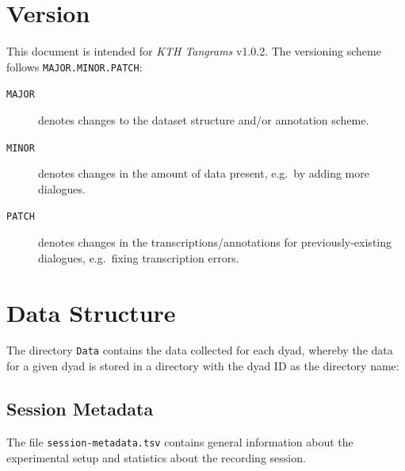 \documentclass[USenglish]{article}
\newcommand{\inlinecode}[1]{\texttt{#1}}	%
\newcommand{\corpusname}{KTH Tangrams}
\newcommand{\corpusversion}{\mbox{v1.0.2}}
\begin{document}
\section{Version}

This document is intended for  \emph{\corpusname{}} \corpusversion{}. The versioning scheme follows \inlinecode{MAJOR.MINOR.PATCH}:

\begin{description}
	\item[\inlinecode{MAJOR}] denotes changes to the dataset structure and\slash{}or annotation scheme.
	\item[\inlinecode{MINOR}] denotes changes in the amount of data present, e.g.\ by adding more dialogues.
	\item[\inlinecode{PATCH}] denotes changes in the transcriptions\slash{}annotations for previously-existing dialogues, e.g.\ fixing transcription errors.
\end{description}

\section{Data Structure}

The directory \inlinecode{Data} contains the data collected for each dyad, whereby the data for a given dyad is stored in a directory with the dyad ID as the directory name:


\subsection{Session Metadata}

The file \inlinecode{session-metadata.tsv} contains general information about the experimental setup and statistics about the recording session.
\end{document}
